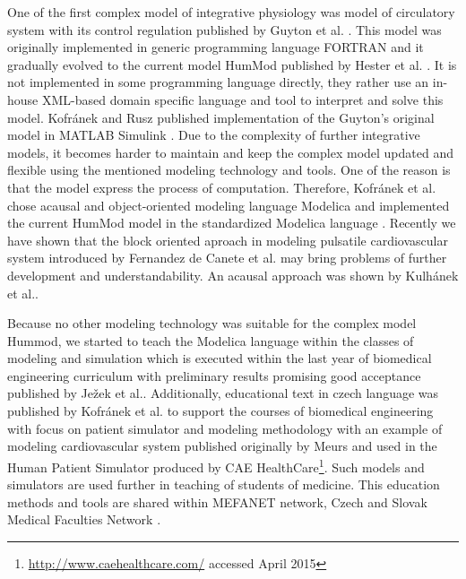 \documentclass[letterpaper, 10 pt, conference]{ieeeconf}  %
\begin{document}
One of the first complex model of integrative physiology was model of circulatory system with its control regulation published by Guyton et al. \cite{Guyton1972}. This model was originally implemented in generic programming language FORTRAN and it gradually evolved to the current model HumMod published by Hester et al. \cite{hester2011}. It is not implemented in some programming language directly, they rather use an in-house XML-based domain specific language and tool to interpret and solve this model. Kofránek and Rusz published implementation of the Guyton's original model in MATLAB Simulink \cite{Kofranek2010}. Due to the complexity of further integrative models, it becomes harder to maintain and keep the complex model updated and flexible using the mentioned modeling technology and tools. One of the reason is that the model express the process of computation.  
Therefore, Kofránek et al. chose acausal and object-oriented modeling language Modelica and implemented the current HumMod model in the standardized Modelica language \cite{Kofranek2011hummod}. Recently we have shown that the block oriented aproach in modeling pulsatile cardiovascular system introduced by Fernandez de Canete et al.\cite{FernandezdeCanete2014} may bring problems of further development and understandability. An acausal approach was shown by Kulhánek et al.\cite{Kulhanek2014Modeling}.


Because no other modeling technology was suitable for the complex model Hummod, we started to teach the Modelica language within the classes of modeling and simulation which is executed within the last year of biomedical engineering curriculum with preliminary results promising good acceptance published by Ježek et al.\cite{Jezek2012}.
Additionally, educational text in czech language was published by Kofránek et al.\cite{kofranek2013Pacientske} to support the courses of biomedical engineering with focus on patient simulator and modeling methodology with an example of modeling cardiovascular system published originally by Meurs \cite{Meurs2011} and used in the \textregistered Human Patient Simulator produced by CAE HealthCare\footnote{\url{http://www.caehealthcare.com/} accessed April 2015}. Such models and simulators are used further in teaching of students of medicine. This  education methods and tools are shared within MEFANET network, Czech and Slovak Medical Faculties Network \cite{Schwarz2014}.
\end{document}
